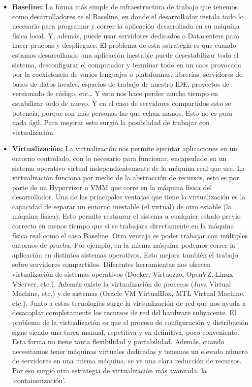 \begin{itemize}

\item \textbf{Baseline:} La forma más simple de infraestructura de trabajo que tenemos como desarrolladores es el Baseline, en donde el desarrollador instala todo lo necesario para programar y correr la aplicación desarrollada en su máquina física local. Y, además, puede usar servidores dedicados o Datacenters para hacer pruebas y despliegues. El problema de esta estrategia es que cuando estamos desarrollando una aplicación inestable puede desestabilizar todo el sistema, desconfigurar el computador y terminar todo en un caos provocado por la coexistencia de varios lenguajes o plataformas, librerías, servidores de bases de datos locales, espacios de trabajo de nuestro IDE, proyectos de versionado de código, etc… Y esto nos hace perder mucho tiempo en estabilizar todo de nuevo. Y en el caso de servidores compartidos esto se potencia, porque son más personas las que echan manos. Esto no es para nada ágil. Para mejorar esto surgió la posibilidad de trabajar con virtualización.

\item \textbf{Virtualización:} La virtualización nos permite ejecutar aplicaciones en un entorno controlado, con lo necesario para funcionar, encapsulado en un sistema operativo virtual independientemente de la máquina real que use. La virtualización funciona por medio de la abstracción de recursos, esto es por parte de un Hypervisor o VMM que corre en la máquina física del desarrollador. Una de las principales ventajas que tiene la virtualización es la capacidad de separar un entorno inestable (el virtual) de otro estable (la máquina física).  Esto permite restaurar el sistema a cualquier estado previo correcto en menos tiempo que si se trabajara directamente en la máquina física real como el caso Baseline. Otra ventaja es poder trabajar con múltiples entornos de prueba. Por ejemplo, en la misma máquina podemos correr la aplicación en distintos sistemas operativos. Esto mejora también el trabajo sobre servidores compartidos. Diferentes herramientas nos ofrecen virtualización de sistemas operativos (Docker, Virtuozzo, OpenVZ, Linux-VServer, etc.). Además existe la virtualización de procesos (Java Virtual Machine, etc.) y de sistemas (Oracle VM VirtualBox, MTL Virtual Machine, etc.). Junto a estas tecnologías surge la virtualización de red que nos ayuda a desacoplar completamente los recursos de red del hardware subyacente. El problema de la virtualización es que el proceso de configuración y distribución sigue siendo una tarea manual, repetitiva y en definitiva, poco conveniente. Esta forma no tiene tanta flexibilidad y portabilidad. Además, cuando necesitamos tener máquinas virtuales dedicadas y tenemos un elevado número de servidores en una misma máquina, se ve una clara reducción de recursos. Por eso surgió otra estrategia de virtualización más avanzada, la ‘containerización’.


\end{itemize}
